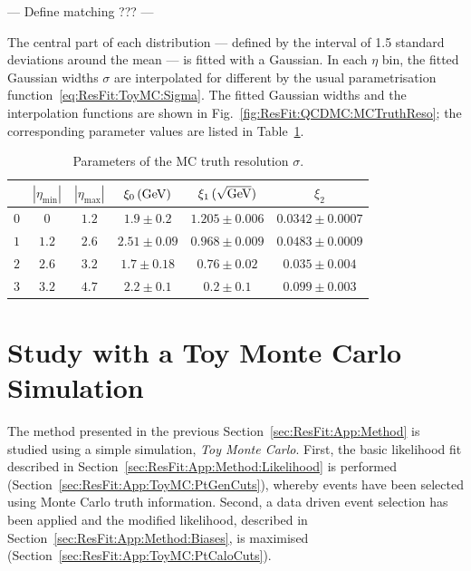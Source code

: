 --- Define matching ??? ---

The central part of each distribution --- defined by the interval of 1.5 standard deviations around the mean --- is fitted with a Gaussian.
In each $\eta$ bin, the fitted Gaussian widths $\sigma$ are interpolated for different \pt by the usual parametrisation function~\eqref{eq:ResFit:ToyMC:Sigma}.
The fitted Gaussian widths and the interpolation functions are shown in Fig.~\ref{fig:ResFit:QCDMC:MCTruthReso}; the corresponding parameter values are listed in Table~\ref{tab:ResFit:QCDMC:MCTruthReso}.
\begin{table}[ht]
  \caption{Parameters of the MC truth resolution $\sigma$.}
  \centering
  \begin{tabular}[h]{cccccc}
    \toprule
    & $|\eta_{\text{min}}|$ & $|\eta_{\text{max}}|$ & $\xi_{0}\,(\text{Ge}\kern-0.06667em\text{V})$ & $\xi_{1}\,(\sqrt{\text{Ge}\kern-0.06667em\text{V}})$ & $\xi_{2}$ \\
    \midrule
    $0$ & $0$ & $1.2$ & $1.9\pm0.2$ & $1.205\pm0.006$  & $0.0342\pm0.0007$ \\
    $1$ & $1.2$ & $2.6$ & $2.51\pm0.09$ & $0.968\pm0.009$  & $0.0483\pm0.0009$ \\
    $2$ & $2.6$ & $3.2$ & $1.7\pm0.18$ & $0.76\pm0.02$  & $0.035\pm0.004$ \\
    $3$ & $3.2$ & $4.7$ & $2.2\pm0.1$ & $0.2\pm0.1$  & $0.099\pm0.003$ \\
    \bottomrule
  \end{tabular}
  \label{tab:ResFit:QCDMC:MCTruthReso}
\end{table}


\section{Study with a Toy Monte Carlo Simulation}\label{sec:ResFit:App:ToyMC}


The method presented in the previous Section~\ref{sec:ResFit:App:Method}
is studied using a simple simulation, \textit{Toy Monte Carlo}.
First, the basic likelihood fit described in
Section~\ref{sec:ResFit:App:Method:Likelihood} is performed (Section~\ref{sec:ResFit:App:ToyMC:PtGenCuts}),
whereby events have been selected using Monte Carlo truth information.
Second, a data driven event selection has been applied and the
modified likelihood, described in
Section~\ref{sec:ResFit:App:Method:Biases}, is maximised (Section~\ref{sec:ResFit:App:ToyMC:PtCaloCuts}).


